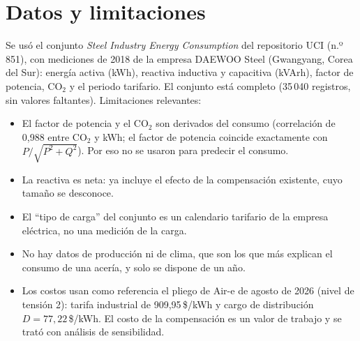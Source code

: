\documentclass[11pt,a4paper]{article}
\begin{document}
\section{Datos y limitaciones}
Se usó el conjunto \emph{Steel Industry Energy Consumption} del repositorio UCI (n.º 851), con mediciones de 2018 de la empresa DAEWOO Steel (Gwangyang, Corea del Sur): energía activa (kWh), reactiva inductiva y capacitiva (kVArh), factor de potencia, CO$_2$ y el periodo tarifario. El conjunto está completo (35\,040 registros, sin valores faltantes). Limitaciones relevantes:
\begin{itemize}
\item El factor de potencia y el CO$_2$ son derivados del consumo (correlación de 0,988 entre CO$_2$ y kWh; el factor de potencia coincide exactamente con $P/\sqrt{P^2+Q^2}$). Por eso no se usaron para predecir el consumo.
\item La reactiva es neta: ya incluye el efecto de la compensación existente, cuyo tamaño se desconoce.
\item El ``tipo de carga'' del conjunto es un calendario tarifario de la empresa eléctrica, no una medición de la carga.
\item No hay datos de producción ni de clima, que son los que más explican el consumo de una acería, y solo se dispone de un año.
\item Los costos usan como referencia el pliego de Air-e de agosto de 2026 (nivel de tensión 2): tarifa industrial de 909,95\,\$/kWh y cargo de distribución $D=77{,}22$\,\$/kWh. El costo de la compensación es un valor de trabajo y se trató con análisis de sensibilidad.
\end{itemize}
\end{document}
